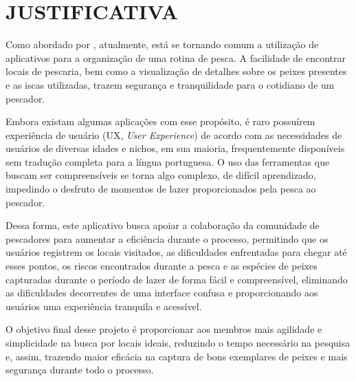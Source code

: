 \chapter{JUSTIFICATIVA}
\label{chap:justificativa}

Como abordado por \textcite{skov2021expert}, atualmente, está se tornando comum a utilização de aplicativos para a organização de uma rotina de pesca. A facilidade de encontrar locais de pescaria, bem como a visualização de detalhes sobre os peixes presentes e as iscas utilizadas, trazem segurança e tranquilidade para o cotidiano de um pescador.

Embora existam algumas aplicações com esse propósito, é raro possuírem experiência de usuário (UX, \textit{User Experience}) de acordo com as necessidades de usuários de diversas idades e nichos, em sua maioria, frequentemente disponíveis sem tradução completa para a língua portuguesa. O uso das ferramentas que buscam ser compreensíveis se torna algo complexo, de difícil aprendizado, impedindo o desfruto de momentos de lazer proporcionados pela pesca ao pescador.

Dessa forma, este aplicativo busca apoiar a colaboração da comunidade de pescadores para aumentar a eficiência durante o processo, permitindo que os usuários registrem os locais visitados, as dificuldades enfrentadas para chegar até esses pontos, os riscos encontrados durante a pesca e as espécies de peixes capturadas durante o período de lazer de forma fácil e compreensível, eliminando as dificuldades decorrentes de uma interface confusa e proporcionando aos usuários uma experiência tranquila e acessível.

O objetivo final desse projeto é proporcionar aos membros mais agilidade e simplicidade na busca por locais ideais, reduzindo o tempo necessário na pesquisa e, assim, trazendo maior eficácia na captura de bons exemplares de peixes e mais segurança durante todo o processo.


